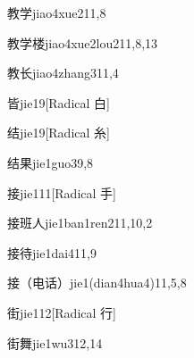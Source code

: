 \begin{verbete}{教学}{jiao4xue2}{11,8}
\end{verbete}

\begin{verbete}{教学楼}{jiao4xue2lou2}{11,8,13}
\end{verbete}

\begin{verbete}{教长}{jiao4zhang3}{11,4}
\end{verbete}

\begin{verbete}{皆}{jie1}{9}[Radical 白]
\end{verbete}

\begin{verbete}{结}{jie1}{9}[Radical 糸]
\end{verbete}

\begin{verbete}{结果}{jie1guo3}{9,8}
\end{verbete}

\begin{verbete}{接}{jie1}{11}[Radical 手]
\end{verbete}

\begin{verbete}{接班人}{jie1ban1ren2}{11,10,2}
\end{verbete}

\begin{verbete}{接待}{jie1dai4}{11,9}
\end{verbete}

\begin{verbete}{接（电话）}{jie1(dian4hua4)}{11,5,8}
\end{verbete}

\begin{verbete}{街}{jie1}{12}[Radical 行]
\end{verbete}

\begin{verbete}{街舞}{jie1wu3}{12,14}
\end{verbete}

